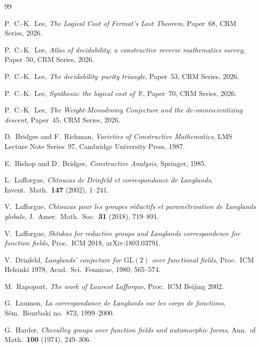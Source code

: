 \documentclass[11pt]{article}
\theoremstyle{plain}
\theoremstyle{definition}
\theoremstyle{remark}
\newcommand{\R}{\mathbb{R}}
\newcommand{\GL}{\mathrm{GL}}
\begin{document}
\begin{thebibliography}{99}

P.~C.-K.~Lee,
\emph{The Logical Cost of Fermat's Last Theorem},
Paper~68, CRM Series, 2026.

P.~C.-K.~Lee,
\emph{Atlas of decidability: a constructive reverse mathematics survey},
Paper~50, CRM Series, 2026.

P.~C.-K.~Lee,
\emph{The decidability--purity triangle},
Paper~53, CRM Series, 2026.

P.~C.-K.~Lee,
\emph{Synthesis: the logical cost of~$\R$},
Paper~70, CRM Series, 2026.

P.~C.-K.~Lee,
\emph{The Weight-Monodromy Conjecture and the de-omniscientizing descent},
Paper~45, CRM Series, 2026.

D.~Bridges and F.~Richman,
\emph{Varieties of Constructive Mathematics},
LMS Lecture Note Series~97, Cambridge University Press, 1987.

E.~Bishop and D.~Bridges,
\emph{Constructive Analysis},
Springer, 1985.

L.~Lafforgue,
\emph{Chtoucas de Drinfeld et correspondance de Langlands},
Invent.\ Math.\ \textbf{147} (2002), 1--241.

V.~Lafforgue,
\emph{Chtoucas pour les groupes r\'eductifs et param\'etrisation de Langlands globale},
J.\ Amer.\ Math.\ Soc.\ \textbf{31} (2018), 719--891.

V.~Lafforgue,
\emph{Shtukas for reductive groups and Langlands correspondence for function fields},
Proc.\ ICM 2018, arXiv:1803.03791.

V.~Drinfeld,
\emph{Langlands' conjecture for $\GL(2)$ over functional fields},
Proc.\ ICM Helsinki 1978, Acad.\ Sci.\ Fennicae, 1980, 565--574.

M.~Rapoport,
\emph{The work of Laurent Lafforgue},
Proc.\ ICM Beijing 2002.

G.~Laumon,
\emph{La correspondance de Langlands sur les corps de fonctions},
S\'em.\ Bourbaki no.~873, 1999--2000.

G.~Harder,
\emph{Chevalley groups over function fields and automorphic forms},
Ann.\ of Math.\ \textbf{100} (1974), 249--306.


\end{thebibliography}
\end{document}
